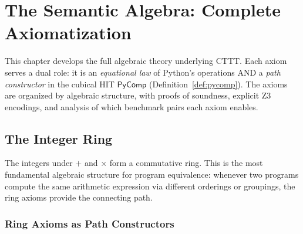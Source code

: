 \chapter{The Semantic Algebra: Complete Axiomatization}
\label{ch:axioms}

This chapter develops the full algebraic theory underlying CTTT.
Each axiom serves a dual role: it is an \emph{equational law} of
Python's operations AND a \emph{path constructor} in the cubical HIT
$\mathsf{PyComp}$ (Definition~\ref{def:pycomp}).  The axioms are
organized by algebraic structure, with proofs of soundness, explicit
Z3 encodings, and analysis of which benchmark pairs each axiom enables.

\section{The Integer Ring}

The integers under $+$ and $\times$ form a commutative ring.  This
is the most fundamental algebraic structure for program equivalence:
whenever two programs compute the same arithmetic expression via
different orderings or groupings, the ring axioms provide the
connecting path.

\subsection{Ring Axioms as Path Constructors}

